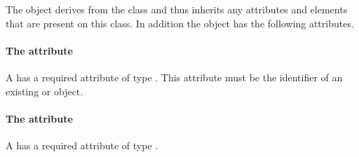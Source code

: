 


The \ThingC object derives from the \SBase class and thus inherits any
attributes and elements that are present on this class.
In addition the \ThingC object has the following attributes.

\paragraph{The \fixttspace{} attribute}

A \ThingC has a required attribute  of type
.
This attribute must be the identifier of an existing \ThingA or \ThingB
object.


\paragraph{The \fixttspace{} attribute}

A \ThingC has a required attribute  of type .


